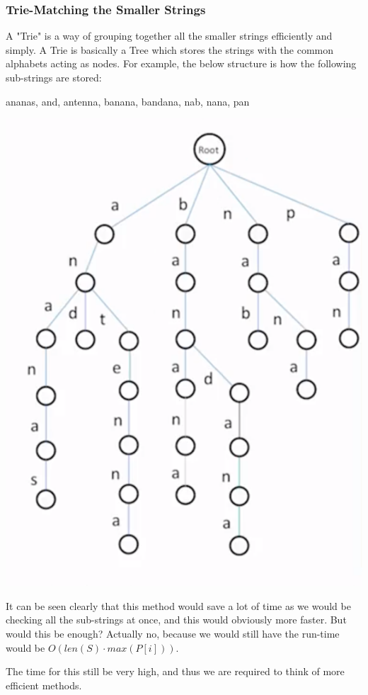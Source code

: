 \documentclass{article}
\theoremstyle{definition}
\theoremstyle{example}
\begin{document}
\subsubsection{\Large Trie-Matching the Smaller Strings}
\hspace{4mm} A "Trie" is a way of grouping together all the smaller strings efficiently and simply. A Trie is basically a Tree which stores the strings with the common alphabets acting as nodes. For example, the below structure is how the following sub-strings are stored:\par
\vspace{2mm}
\begin{center}
     ananas,
     and,
     antenna,
     banana,
     bandana,
     nab,
     nana,
     pan
\end{center}
\vspace{4mm}
\begin{center}
    \includegraphics[scale = 0.5]{Trie_ss.png}    
\end{center}
\vspace{4mm}
\hspace{4mm} It can be seen clearly that this method would save a lot of time as we would be checking all the sub-strings at once, and this would obviously more faster. But would this be enough? Actually no, because we would still have the run-time would be $O(len(S)\cdot max(P[i]))$.\par
\vspace{4mm}
The time for this still be very high, and thus we are required to think of more efficient methods.
\newpage
\end{document}
